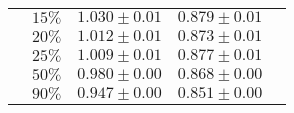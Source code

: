 \begin{longtable}{lrccc}
                        & $15\%$                      & $1.030 \pm 0.01$ & $0.879 \pm 0.01$ \\
                        & $20\%$                      & $1.012 \pm 0.01$ & $0.873 \pm 0.01$ \\
                        & $25\%$                      & $1.009 \pm 0.01$ & $0.877 \pm 0.01$ \\
                        & $50\%$                      & $0.980 \pm 0.00$ & $0.868 \pm 0.00$ \\
                        & $90\%$                      & $0.947 \pm 0.00$ & $0.851 \pm 0.00$ \\
\bottomrule
\end{longtable}
